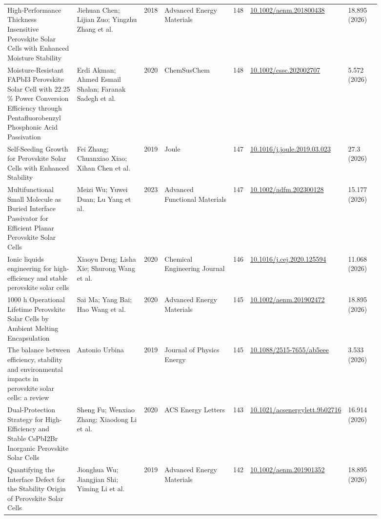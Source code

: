 \documentclass[10pt,a4paper]{article}
\begin{document}
{\begin{longtable}{p{0.197\linewidth}p{0.197\linewidth}p{0.043\linewidth}p{0.197\linewidth}p{0.043\linewidth}p{0.117\linewidth}p{0.098\linewidth}}
High‐Performance Thickness Insensitive Perovskite Solar Cells with Enhanced Moisture Stability & Jiehuan Chen; Lijian Zuo; Yingzhu Zhang et al. & 2018 & Advanced Energy Materials & 148 & \href{https://doi.org/10.1002/aenm.201800438}{10.1002/aenm.201800438} & 18.895 (2026) \\
Moisture‐Resistant FAPbI3 Perovskite Solar Cell with 22.25 \% Power Conversion Efficiency through Pentafluorobenzyl Phosphonic Acid Passivation & Erdi Akman; Ahmed Esmail Shalan; Faranak Sadegh et al. & 2020 & ChemSusChem & 148 & \href{https://doi.org/10.1002/cssc.202002707}{10.1002/cssc.202002707} & 5.572 (2026) \\
Self-Seeding Growth for Perovskite Solar Cells with Enhanced Stability & Fei Zhang; Chuanxiao Xiao; Xihan Chen et al. & 2019 & Joule & 147 & \href{https://doi.org/10.1016/j.joule.2019.03.023}{10.1016/j.joule.2019.03.023} & 27.3 (2026) \\
Multifunctional Small Molecule as Buried Interface Passivator for Efficient Planar Perovskite Solar Cells & Meizi Wu; Yuwei Duan; Lu Yang et al. & 2023 & Advanced Functional Materials & 147 & \href{https://doi.org/10.1002/adfm.202300128}{10.1002/adfm.202300128} & 15.177 (2026) \\
Ionic liquids engineering for high-efficiency and stable perovskite solar cells & Xiaoyu Deng; Lisha Xie; Shurong Wang et al. & 2020 & Chemical Engineering Journal & 146 & \href{https://doi.org/10.1016/j.cej.2020.125594}{10.1016/j.cej.2020.125594} & 11.068 (2026) \\
1000 h Operational Lifetime Perovskite Solar Cells by Ambient Melting Encapsulation & Sai Ma; Yang Bai; Hao Wang et al. & 2020 & Advanced Energy Materials & 145 & \href{https://doi.org/10.1002/aenm.201902472}{10.1002/aenm.201902472} & 18.895 (2026) \\
The balance between efficiency, stability and environmental impacts in perovskite solar cells: a review & Antonio Urbina & 2019 & Journal of Physics Energy & 145 & \href{https://doi.org/10.1088/2515-7655/ab5eee}{10.1088/2515-7655/ab5eee} & 3.533 (2026) \\
Dual-Protection Strategy for High-Efficiency and Stable CsPbI2Br Inorganic Perovskite Solar Cells & Sheng Fu; Wenxiao Zhang; Xiaodong Li et al. & 2020 & ACS Energy Letters & 143 & \href{https://doi.org/10.1021/acsenergylett.9b02716}{10.1021/acsenergylett.9b02716} & 16.914 (2026) \\
Quantifying the Interface Defect for the Stability Origin of Perovskite Solar Cells & Jionghua Wu; Jiangjian Shi; Yiming Li et al. & 2019 & Advanced Energy Materials & 142 & \href{https://doi.org/10.1002/aenm.201901352}{10.1002/aenm.201901352} & 18.895 (2026) \\

\end{longtable}}
\end{document}
